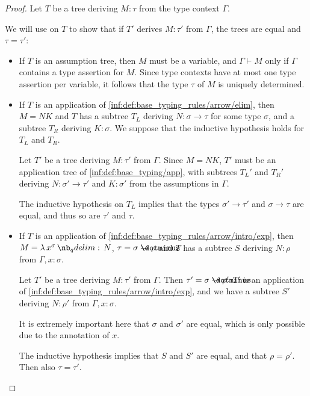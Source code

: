 \begin{proof}
  Let \( T \) be a tree deriving \( M: \tau \) from the type context \( \Gamma \).

  We will use  on \( T \) to show that if \( T' \) derives \( M: \tau' \) from \( \Gamma \), the trees are equal and \( \tau = \tau' \):
  \begin{itemize}
    \item If \( T \) is an assumption tree, then \( M \) must be a variable, and \( \Gamma \vdash M \) only if \( \Gamma \) contains a type assertion for \( M \). Since type contexts have at most one type assertion per variable, it follows that the type \( \tau \) of \( M \) is uniquely determined.

    \item If \( T \) is an application of \ref{inf:def:base_typing_rules/arrow/elim}, then \( M = NK \) and \( T \) has a subtree \( T_L \) deriving \( N: \sigma \to \tau \) for some type \( \sigma \), and a subtree \( T_R \) deriving \( K: \sigma \). We suppose that the inductive hypothesis holds for \( T_L \) and \( T_R \).

    Let \( T' \) be a tree deriving \( M: \tau' \) from \( \Gamma \). Since \( M = NK \), \( T' \) must be an application tree of \ref{inf:def:base_typing/app}, with subtrees \( T_L' \) and \( T_R' \) deriving \( N: \sigma' \to \tau' \) and \( K: \sigma' \) from the assumptions in \( \Gamma \).

    The inductive hypothesis on \( T_L \) implies that the types \( \sigma' \to \tau' \) and \( \sigma \to \tau \) are equal, and thus so are \( \tau' \) and \( \tau \).

    \item If \( T \) is an application of \ref{inf:def:base_typing_rules/arrow/intro/exp}, then \( M = \qabs {x^\sigma} N \), \( \tau = \sigma \synimplies \rho \) and \( T \) has a subtree \( S \) deriving \( N: \rho \) from \( \Gamma, x: \sigma \).

    Let \( T' \) be a tree deriving \( M: \tau' \) from \( \Gamma \). Then \( \tau' = \sigma \synimplies \rho' \) \( T' \) is an application of \ref{inf:def:base_typing_rules/arrow/intro/exp}, and we have a subtree \( S' \) deriving \( N: \rho' \) from \( \Gamma, x: \sigma \).

    It is extremely important here that \( \sigma \) and \( \sigma' \) are equal, which is only possible due to the annotation of \( x \).

    The inductive hypothesis implies that \( S \) and \( S' \) are equal, and that \( \rho = \rho' \). Then also \( \tau = \tau' \).
  \end{itemize}
\end{proof}

